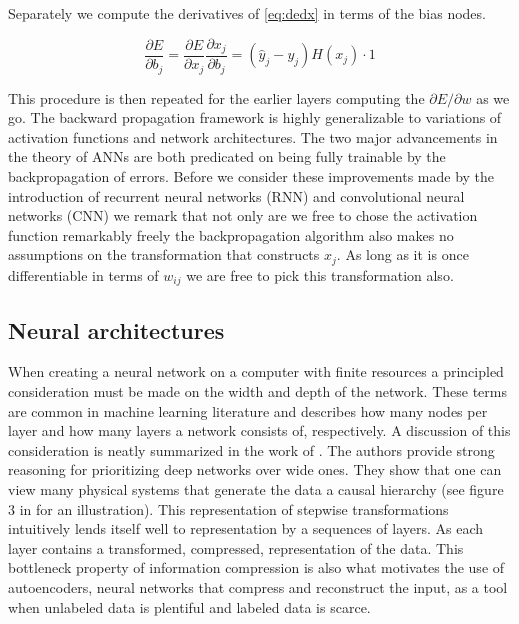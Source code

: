 \noindent Separately we compute the derivatives of \ref{eq:dedx} in terms of the bias nodes.

\begin{equation}
\frac{\partial E}{\partial b_j} = \frac{\partial E}{\partial x_j} \frac{\partial x_j}{\partial b_j} =   (\hat{y}_{j} - y_{j}) H(x_j) \cdot 1
\end{equation}

\noindent This procedure is then repeated for the earlier layers computing the $
\partial E / \partial w $ as we go. The backward propagation framework is highly generalizable to variations of activation functions and network architectures. The two major advancements in the theory of ANNs are both predicated on being fully trainable by the backpropagation of errors. Before we consider these improvements made by the introduction of recurrent neural networks (RNN) and convolutional neural networks (CNN) we remark that not only are we free to chose the activation function remarkably freely the backpropagation algorithm also makes no assumptions on the transformation that constructs $x_j$. As long as it is once differentiable in terms of $w_{ij}$ we are free to pick this transformation also. 

\subsection{Neural architectures}

When creating a neural network on a computer with finite resources a principled consideration must be made on the width and depth of the network. These terms are common in machine learning literature and describes how many nodes per layer and how many layers a network consists of, respectively. A discussion of this consideration is neatly summarized in the work of \citet{Lin2017}. The authors provide strong reasoning for prioritizing deep networks over wide ones. They show that one can view many physical systems that generate the data a causal hierarchy (see figure 3 in \citet{Lin2017} for an illustration). This representation of stepwise transformations intuitively lends itself well to representation by a sequences of layers. As each layer contains a transformed, compressed, representation of the data. This bottleneck property of information compression is also what motivates the use of autoencoders, neural networks that compress and reconstruct the input, as a tool when unlabeled data is plentiful and labeled data is scarce.

